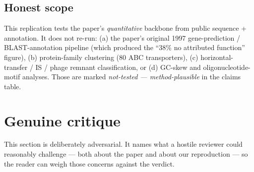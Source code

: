 \documentclass[11pt,letterpaper]{article}
\begin{document}
\subsection*{Honest scope}

This replication tests the paper's \emph{quantitative} backbone from public sequence + annotation.
It does not re-run: (a) the paper's original 1997 gene-prediction / BLAST-annotation pipeline
(which produced the ``38\% no attributed function'' figure), (b) protein-family clustering
(80 ABC transporters), (c) horizontal-transfer / IS / phage remnant classification, or (d) GC-skew
and oligonucleotide-motif analyses. Those are marked \emph{not-tested --- method-plausible} in the
claims table.

\section{Genuine critique}

This section is deliberately adversarial. It names what a hostile reviewer could reasonably
challenge --- both about the paper and about our reproduction --- so the reader can weigh those
concerns against the verdict.
\end{document}
